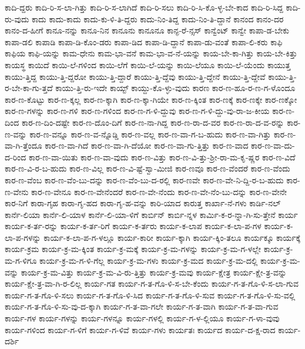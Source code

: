 {ಕಾದಿ-ದ್ದರು
ಕಾದಿ-ರಿ-ಸ-ಲಾ-ಗಿತ್ತು
ಕಾದಿ-ರಿ-ಸ-ಲಾಗಿದೆ
ಕಾದಿ-ರಿ-ಸಲು
ಕಾದಿ-ರಿ-ಸಿ-ಕೊ-ಳ್ಳ-ಬೇ-ಕಾದ
ಕಾದಿ-ರಿ-ಸಿದ್ದ
ಕಾದಿ-ರು-ವುದು
ಕಾದು
ಕಾದು-ಕಾದು
ಕಾದು-ಕು-ಳಿ-ತಿ-ದ್ದರು
ಕಾದು-ನಿಂ-ತಿದ್ದ
ಕಾದು-ನಿಂ-ತಿ-ದ್ದಾನೆ
ಕಾನಂದ
ಕಾನಂ-ದರ
ಕಾನಂ-ದ-ಹೀಗೆ
ಕಾನೂ-ನನ್ನು
ಕಾನೂ-ನಿನ
ಕಾನೂನು
ಕಾನೂನೂ
ಕಾನ್ಫ-ರೆ-ನ್ಸಸ್
ಕಾನ್ವೆಂಟ್
ಕಾನ್ವೇ
ಕಾಪಾ-ಡ-ಬೇಕು
ಕಾಪಾ-ಡಲಿ
ಕಾಪಾಡಿ
ಕಾಪಾ-ಡಿ-ಕೊಂ-ಡರು
ಕಾಪಾ-ಡಿದ
ಕಾಪಾ-ಡಿ-ದ್ದಾನೆ
ಕಾಪಾ-ಡು-ವಂತೆ
ಕಾಪಾ-ಲಿ-ಕರು
ಕಾಫಿ
ಕಾಫಿಯ
ಕಾಫಿ-ಯನ್ನು
ಕಾಮ-ಧೇನು
ಕಾಮ-ಭಾ-ವನೆ
ಕಾಮ-ಭಾ-ವ-ನೆ-ಯನ್ನು
ಕಾಯ-ಬೇ-ಕಾ-ಗಿತ್ತು
ಕಾಯ-ಬೇ-ಕಿತ್ತು
ಕಾಯಸ್ಥ
ಕಾಯಿದೆ
ಕಾಯಿ-ಲೆ-ಗಳಿಂದ
ಕಾಯಿ-ಲೆಗೆ
ಕಾಯಿ-ಲೆ-ಯನ್ನು
ಕಾಯಿ-ಲೆಯೂ
ಕಾಯಿ-ಲೆ-ಯೆಂದು
ಕಾಯುತ್ತ
ಕಾಯು-ತ್ತಿದ್ದ
ಕಾಯು-ತ್ತಿ-ದ್ದರೋ
ಕಾಯು-ತ್ತಿ-ದ್ದಾರೆ
ಕಾಯು-ತ್ತಿ-ದ್ದೆವು
ಕಾಯು-ತ್ತಿ-ದ್ದೇನೆ
ಕಾಯು-ತ್ತಿ-ದ್ದೇವೆ
ಕಾಯು-ತ್ತಿ-ರ-ಬೇ-ಕಾ-ಗು-ತ್ತದೆ
ಕಾಯು-ತ್ತಿ-ರು-ಇದೇ
ಕಾಯ್ಟ್
ಕಾಯ್ದು-ಕೊ-ಳ್ಳು-ವುದು
ಕಾರಣ
ಕಾರ-ಣ-ಹೂ-ರ-ಣ-ಗ-ಳೊಂದೂ
ಕಾರ-ಣ-ಕೊಟ್ಟು
ಕಾರ-ಣ-ಕ್ಕಲ್ಲ
ಕಾರ-ಣ-ಕ್ಕಾಗಿ
ಕಾರ-ಣ-ಕ್ಕಾ-ಗಿಯೇ
ಕಾರ-ಣ-ಕ್ಕಿಂತ
ಕಾರ-ಣಕ್ಕೆ
ಕಾರ-ಣಕ್ಕೇ
ಕಾರ-ಣಕ್ಕೋ
ಕಾರ-ಣ-ಗಳನ್ನು
ಕಾರ-ಣ-ಗಳಿ
ಕಾರ-ಣ-ಗಳಿಂದ
ಕಾರ-ಣ-ಗ-ಳಿ-ದ್ದುವು
ಕಾರ-ಣ-ಗ-ಳಿ-ದ್ದು-ವು-ರಾ-ಜ-ಕೀಯ
ಕಾರ-ಣ-ದಿಂದ
ಕಾರ-ಣ-ದಿಂ-ದಷ್ಟೇ
ಕಾರ-ಣ-ದೊಂ-ದಿಗೆ
ಕಾರ-ಣ-ನಾ-ಗಿದ್ದ
ಕಾರ-ಣ-ರಾ-ದ-ವರ
ಕಾರ-ಣ-ರಾ-ದ-ವ-ರನ್ನು
ಕಾರ-ಣ-ವನ್ನು
ಕಾರ-ಣ-ವನ್ನೂ
ಕಾರ-ಣ-ವ-ನ್ನೊಡ್ಡಿ
ಕಾರ-ಣ-ವಲ್ಲ
ಕಾರ-ಣ-ವಾ-ಗ-ಬ-ಹುದು
ಕಾರ-ಣ-ವಾ-ಗಿತ್ತು
ಕಾರ-ಣ-ವಾ-ಗಿ-ತ್ತೆಂದೂ
ಕಾರ-ಣ-ವಾ-ಗಿದೆ
ಕಾರ-ಣ-ವಾ-ಗಿ-ದೆಯೋ
ಕಾರ-ಣ-ವಾ-ಗು-ತ್ತಿತ್ತು
ಕಾರ-ಣ-ವಾದ
ಕಾರ-ಣ-ವಾ-ದು-ದ-ರಿಂದ
ಕಾರ-ಣ-ವಾ-ಯಿತು
ಕಾರ-ಣ-ವಾ-ವುದು
ಕಾರ-ಣ-ವಿತ್ತು
ಕಾರ-ಣ-ವಿ-ತ್ತು-ಶ್ರೀ-ರಾ-ಮ-ಕೃ-ಷ್ಣರ
ಕಾರ-ಣ-ವಿದೆ
ಕಾರ-ಣ-ವಿ-ರ-ಬ-ಹುದು
ಕಾರ-ಣ-ವಿಲ್ಲ
ಕಾರ-ಣ-ವಿ-ಷ್ಟೆ-ಸ್ವಾ-ಮೀಜಿ
ಕಾರ-ಣವೂ
ಕಾರ-ಣ-ವೆಂದರೆ
ಕಾರ-ಣ-ವೆಂದು
ಕಾರ-ಣ-ವೆಂಬ
ಕಾರ-ಣ-ವೆಂ-ಬು-ದನ್ನು
ಕಾರ-ಣ-ವೆಂ-ಬು-ದ-ರಲ್ಲಿ
ಕಾರ-ಣವೇ
ಕಾರ-ಣ-ವೇ-ನಿ-ದ್ದಿ-ರ-ಬ-ಹುದು
ಕಾರ-ಣ-ವೇನು
ಕಾರ-ಣ-ವೇನೂ
ಕಾರ-ಣ-ವೇನೆಂದರೆ
ಕಾರ-ಣ-ವೇ-ನೆಂದು
ಕಾರ-ಣ-ವೇ-ನೆಂ-ಬು-ದನ್ನು
ಕಾರ-ಣ-ವೇನೇ
ಕಾರ-ನಿಗೆ
ಕಾರಾ-ಗೃಹ
ಕಾರಾ-ಗೃ-ಹದ
ಕಾರಾ-ಗೃ-ಹ-ವನ್ನು
ಕಾರಿ-ಯಾದ
ಕಾರುತ್ತ
ಕಾರ್ಖಾ-ನೆ-ಗಳು
ಕಾರ್ಡಿ-ನಲ್
ಕಾರ್ನೆ-ಲಿಯಾ
ಕಾರ್ನೆ-ಲಿ-ಯಾಳ
ಕಾರ್ನೆ-ಲಿ-ಯಾ-ಳಿಗೆ
ಕಾರ್ಬಿನ್
ಕಾರ್ಬಿ-ನ್ನಳ
ಕಾರ್ಮಿ-ಕ-ರ-ನ್ನಾ-ಗಿ-ಸು-ತ್ತೇನೆ
ಕಾರ್ಯ
ಕಾರ್ಯ-ಕ-ರ್ತ-ರನ್ನು
ಕಾರ್ಯ-ಕ-ರ್ತ-ರಿಗೆ
ಕಾರ್ಯ-ಕ-ರ್ತರು
ಕಾರ್ಯ-ಕ-ಲಾಪ
ಕಾರ್ಯ-ಕ-ಲಾ-ಪ-ಗಳ
ಕಾರ್ಯ-ಕ-ಲಾ-ಪ-ಗಳನ್ನು
ಕಾರ್ಯ-ಕ-ಲಾ-ಪ-ಗ-ಳಲ್ಲೂ
ಕಾರ್ಯ-ಕಾರೀ
ಕಾರ್ಯ-ಕ್ಕಾಗಿ
ಕಾರ್ಯ-ಕ್ಕಿಂ-ತಲೂ
ಕಾರ್ಯಕ್ಕೂ
ಕಾರ್ಯಕ್ಕೆ
ಕಾರ್ಯ-ಕ್ರಮ
ಕಾರ್ಯ-ಕ್ರ-ಮ-ಕ್ಕಿಂತ
ಕಾರ್ಯ-ಕ್ರ-ಮಕ್ಕೆ
ಕಾರ್ಯ-ಕ್ರ-ಮ-ಗಳನ್ನು
ಕಾರ್ಯ-ಕ್ರ-ಮ-ಗ-ಳಲ್ಲೇ
ಕಾರ್ಯ-ಕ್ರ-ಮ-ಗ-ಳಿಗೂ
ಕಾರ್ಯ-ಕ್ರ-ಮ-ಗ-ಳಿ-ಗೆಲ್ಲ
ಕಾರ್ಯ-ಕ್ರ-ಮ-ಗಳು
ಕಾರ್ಯ-ಕ್ರ-ಮದ
ಕಾರ್ಯ-ಕ್ರ-ಮ-ದಲ್ಲಿ
ಕಾರ್ಯ-ಕ್ರ-ಮ-ವನ್ನು
ಕಾರ್ಯ-ಕ್ರ-ಮ-ವಿತ್ತು
ಕಾರ್ಯ-ಕ್ರ-ಮ-ವಿ-ರು-ತ್ತಿತ್ತು
ಕಾರ್ಯ-ಕ್ರ-ಮವು
ಕಾರ್ಯ-ಕ್ಷೇತ್ರ
ಕಾರ್ಯ-ಕ್ಷೇ-ತ್ರ-ವನ್ನು
ಕಾರ್ಯ-ಕ್ಷೇ-ತ್ರ-ವಾ-ಗಿ-ರ-ಲಿಲ್ಲ
ಕಾರ್ಯ-ಗತ
ಕಾರ್ಯ-ಗ-ತ-ಗೊ-ಳಿ-ಸ-ಬೇ-ಕೆಂದು
ಕಾರ್ಯ-ಗ-ತ-ಗೊ-ಳಿ-ಸ-ಲಾ-ಗುವ
ಕಾರ್ಯ-ಗ-ತ-ಗೊ-ಳಿ-ಸಲು
ಕಾರ್ಯ-ಗ-ತ-ಗೊ-ಳಿ-ಸಿದ
ಕಾರ್ಯ-ಗ-ತ-ಗೊ-ಳಿ-ಸುವ
ಕಾರ್ಯ-ಗ-ತ-ಗೊ-ಳಿ-ಸು-ವಲ್ಲಿ
ಕಾರ್ಯ-ಗ-ತ-ಗೊ-ಳಿ-ಸು-ವು-ದ-ಕ್ಕಾಗಿ
ಕಾರ್ಯ-ಗ-ತ-ವಾ-ಗಲೇ
ಕಾರ್ಯ-ಗ-ತ-ವಾಗಿ
ಕಾರ್ಯ-ಗ-ತ-ವಾ-ಗುವ
ಕಾರ್ಯ-ಗಳ
ಕಾರ್ಯ-ಗಳನ್ನು
ಕಾರ್ಯ-ಗಳನ್ನೂ
ಕಾರ್ಯ-ಗಳಲ್ಲಿ
ಕಾರ್ಯ-ಗ-ಳ-ಲ್ಲಿಯೂ
ಕಾರ್ಯ-ಗ-ಳಾ-ವುವು
ಕಾರ್ಯ-ಗಳಿಂದ
ಕಾರ್ಯ-ಗ-ಳಿಗೆ
ಕಾರ್ಯ-ಗ-ಳಿವೆ
ಕಾರ್ಯ-ಗಳು
ಕಾರ್ಯತಃ
ಕಾರ್ಯದ
ಕಾರ್ಯ-ದ-ಕ್ಷ-ರಾದ
ಕಾರ್ಯ-ದರ್ಶಿ
}
